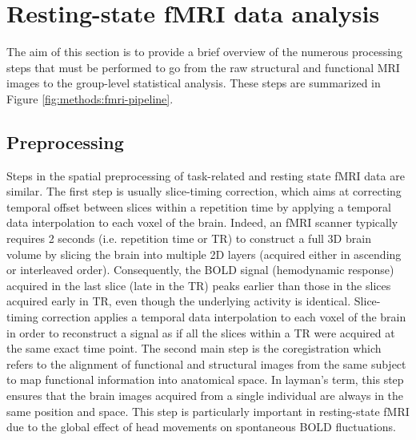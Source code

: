 \section{Resting-state fMRI data analysis}
\label{sec:fmri:rs}

The aim of this section is to provide a brief overview of the numerous processing steps that must be performed to go from the raw structural and functional MRI images to the group-level statistical analysis. These steps are summarized in Figure \ref{fig:methods:fmri-pipeline}.

\subsection{Preprocessing}
\label{sec:fmri:rs:preproc}

Steps in the spatial preprocessing of task-related and resting state fMRI data are similar. The first step is usually slice-timing correction, which aims at correcting temporal offset between slices within a repetition time by applying a temporal data interpolation to each voxel of the brain. Indeed, an fMRI scanner typically requires 2 seconds (i.e. repetition time or TR) to construct a full 3D brain volume by slicing the brain into multiple 2D layers (acquired either in ascending or interleaved order). Consequently, the BOLD signal (hemodynamic response) acquired in the last slice (late in the TR) peaks earlier than those in the slices acquired early in TR, even though the underlying activity is identical. Slice-timing correction applies a temporal data interpolation to each voxel of the brain in order to reconstruct a signal as if all the slices within a TR were acquired at the same exact time point.
The second main step is the coregistration which refers to the alignment of functional and structural images from the same subject to map functional information into anatomical space. In layman’s term, this step ensures that the brain images acquired from a single individual are always in the same position and space. This step is particularly important in resting-state fMRI due to the global effect of head movements on spontaneous BOLD fluctuations.
